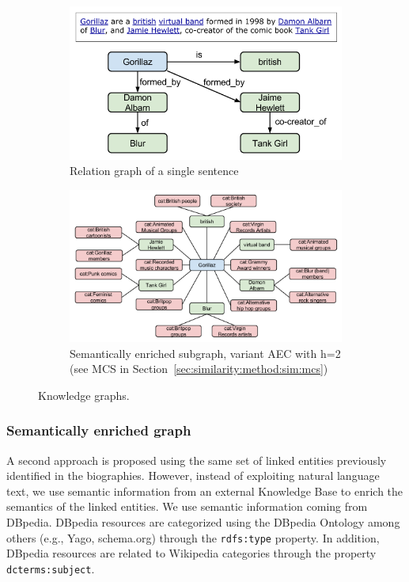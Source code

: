 \begin{figure}[ht!]
    \centering
    \begin{subfigure}{\textwidth}
        \centering
        \includegraphics[width=.7\linewidth]{ch06_similarity_pics/RelationGraph.png}
    	\caption{Relation graph of a single sentence}
        \label{fig:similarity:relation}
    \end{subfigure}
    \begin{subfigure}{\textwidth}
        \centering
        \includegraphics[width=.9\linewidth]{ch06_similarity_pics/EnrichedGraph2.png}
		\caption{Semantically enriched subgraph, variant AEC with h=2 (see MCS in Section~\ref{sec:similarity:method:sim:mcs})}
		\label{fig:similarity:enriched}
    \end{subfigure}
    \caption{Knowledge graphs.}
    \label{fig:similarity:knowledgegraphs}
\end{figure}



\subsubsection{Semantically enriched graph}\label{sec:similarity:semantic_enriched_graph} %

A second approach is proposed using the same set of linked entities previously identified in the biographies. However, instead of exploiting natural language text, we use semantic information from an external Knowledge Base to enrich the semantics of the linked entities. We use semantic information coming from DBpedia. DBpedia resources are categorized using the DBpedia Ontology among others (e.g., Yago, schema.org) through the \texttt{rdfs:type} property. In addition, DBpedia resources are related to Wikipedia categories through the property \texttt{dcterms:subject}.

